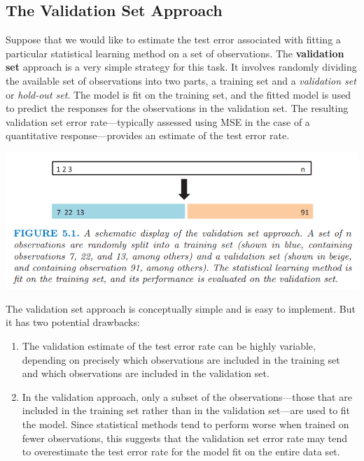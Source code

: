 \subsection{The Validation Set Approach}
Suppose that we would like to estimate the test error associated with fitting a particular statistical learning method on a set of observations. The \textbf{validation set} approach is a very simple strategy for this task.  It involves randomly dividing the available set of observations into two parts, a training set and a \textit{validation set} or \textit{hold-out set}. The model is fit on the training set, and the fitted model is used to predict the responses for the observations in the validation set. The resulting validation set error rate—typically assessed using MSE in the case of a quantitative response—provides an estimate of the test error rate.
\begin{center}
    \includegraphics[scale=0.8]{images/cv.png}
\end{center}
The validation set approach is conceptually simple and is easy to implement. But it has two potential drawbacks:
\begin{enumerate}
    \item The validation estimate of the test error rate can be highly variable, depending on precisely which observations are included in the training set and which observations are included in the validation set.

    \item  In the validation approach, only a subset of the observations—those that are included in the training set rather than in the validation set—are used to fit the model. Since statistical methods tend to perform worse when trained on fewer observations, this suggests that the validation set error rate may tend to overestimate the test error rate for the model fit on the entire data set.

\end{enumerate}

